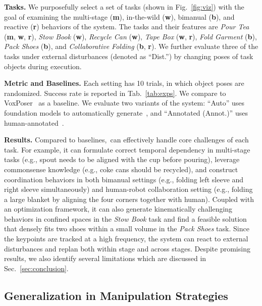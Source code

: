 \textbf{Tasks.}
We purposefully select a set of tasks (shown in Fig.~\ref{fig:viz}) with the goal of examining the multi-stage (\textbf{m}), in-the-wild (\textbf{w}), bimanual (\textbf{b}), and reactive (\textbf{r}) behaviors of the system. The tasks and their features are \textit{Pour Tea} (\textbf{m}, \textbf{w}, \textbf{r}), \textit{Stow Book} (\textbf{w}), \textit{Recycle Can} (\textbf{w}), \textit{Tape Box} (\textbf{w}, \textbf{r}), \textit{Fold Garment} (\textbf{b}), \textit{Pack Shoes} (\textbf{b}), and \textit{Collaborative Folding} (\textbf{b}, \textbf{r}).
We further evaluate three of the tasks under external disturbances (denoted as ``Dist.'') by changing poses of task objects during execution.

\textbf{Metric and Baselines.} Each setting has 10 trials, in which object poses are randomized. Success rate is reported in Tab.~\ref{tab:exps}.
We compare to VoxPoser~\cite{huang2023voxposer} as a baseline.
We evaluate two variants of the system: ``Auto'' uses foundation models to automatically generate~\algabrvname, and ``Annotated (Annot.)'' uses human-annotated~\algabrvname.


\textbf{Results.}
Compared to baselines,~\algabrvname can effectively handle core challenges of each task.
For example, it can formulate correct temporal dependency in multi-stage tasks (e.g., spout needs to be aligned with the cup before pouring), leverage commonsense knowledge (e.g., coke cans should be recycled), and construct coordination behaviors in both bimanual settings (e.g., folding left sleeve and right sleeve simultaneously) and human-robot collaboration setting (e.g., folding a large blanket by aligning the four corners together with human).
Coupled with an optimization framework, it can also generate kinematically challenging behaviors in confined spaces in the \textit{Stow Book} task and find a feasible solution that densely fits two shoes within a small volume in the \textit{Pack Shoes} task.
Since the keypoints are tracked at a high frequency, the system can react to external disturbances and replan both within stage and across stages.
Despite promising results, we also identify several limitations which are discussed in Sec.~\ref{sec:conclusion}.



 



\subsection{Generalization in Manipulation Strategies}\label{sec:generalization}

